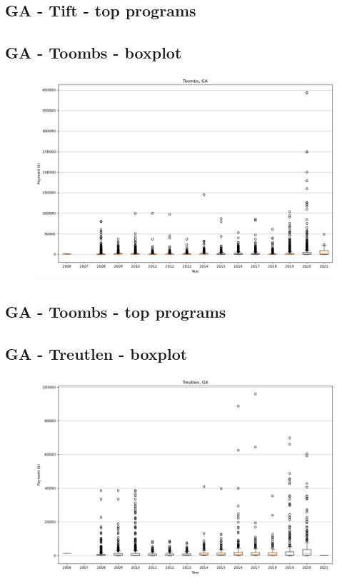 \subsection*{GA - Tift - top programs}

\newpage
\subsection*{GA - Toombs - boxplot}
\begin{figure}[h]
\centering
\includegraphics[width=7in]{../output/boxplots/counties/Toombs-GA_boxplot.png}
\end{figure}


\subsection*{GA - Toombs - top programs}

\newpage
\subsection*{GA - Treutlen - boxplot}
\begin{figure}[h]
\centering
\includegraphics[width=7in]{../output/boxplots/counties/Treutlen-GA_boxplot.png}
\end{figure}


